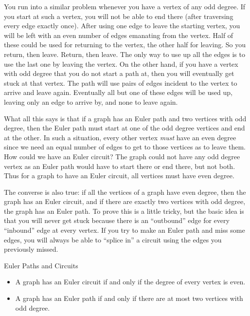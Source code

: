 \documentclass[12pt]{article}
\begin{document}
You run into a similar problem whenever you have a vertex of any odd degree.  If you start at such a vertex, you will not be able to end there (after traversing every edge exactly once).  After using one edge to leave the starting vertex, you will be left with an even number of edges emanating from the vertex.  Half of these could be used for returning to the vertex, the other half for leaving.  So you return, then leave.  Return, then leave.  The only way to use up all the edges is to use the last one by leaving the vertex.  On the other hand, if you have a vertex with odd degree that you do not start a path at, then you will eventually get stuck at that vertex.  The path will use pairs of edges incident to the vertex to arrive and leave again.  Eventually all but one of these edges will be used up, leaving only an edge to arrive by, and none to leave again.

What all this says is that if a graph has an Euler path and two vertices with odd degree, then the Euler path must start at one of the odd degree vertices and end at the other.  In such a situation, every other vertex {\em must} have an even degree since we need an equal number of edges to get to those vertices as to leave them.  How could we have an Euler circuit?  The graph could not have any odd degree vertex as an Euler path would have to start there or end there, but not both.  Thus for a graph to have an Euler circuit, all vertices must have even degree.  

The converse is also true: if all the vertices of a graph have even degree, then the graph has an Euler circuit, and if there are exactly two vertices with odd degree, the graph has an Euler path.  To prove this is a little tricky, but the basic idea is that you will never get stuck because there is an ``outbound'' edge for every ``inbound'' edge at every vertex.  If you try to make an Euler path and miss some edges, you will always be able to ``splice in'' a circuit using the edges you previously missed.

\begin{defbox}{Euler Paths and Circuits}
\begin{itemize}
 \item A graph has an Euler circuit if and only if the degree of every vertex is even.
 \item A graph has an Euler path if and only if there are at most two vertices with odd degree.
\end{itemize}

\end{defbox}
\end{document}
